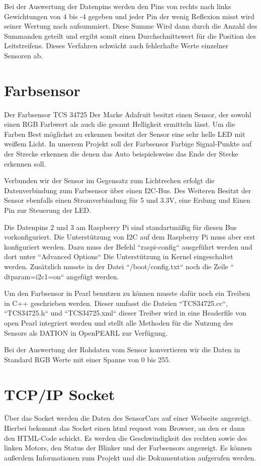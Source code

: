 Bei der Auswertung der Datenpins werden den Pins von rechts nach links Gewichtungen von 4 bis -4 gegeben und jeder Pin der wenig Reflexion misst wird seiner Wertung nach aufsummiert. Diese Summe Wird dann durch die Anzahl des Summanden geteilt und ergibt somit einen Durchschnittswert für die Position des Leitstreifens. Dieses Verfahren schwächt auch fehlerhafte Werte einzelner Sensoren ab.

\section{Farbsensor}
Der Farbsensor TCS 34725 Der Marke Adafruit besitzt einen Sensor, der sowohl einen RGB Farbwert als auch die gesamt Helligkeit ermitteln lässt. Um die Farben Best möglichst zu erkennen besitzt der Sensor eine sehr helle LED mit weißem Licht. In unserem Projekt soll der Farbsensor Farbige Signal-Punkte auf der Strecke erkennen die denen das Auto beispielsweise das Ende der Stecke erkennen soll. 

Verbunden wir der Sensor im Gegensatz zum Lichtrechen erfolgt die Datenverbindung zum Farbsensor über einen I2C-Bus. Des Weiteren Besitzt der Sensor ebenfalls einen Stromverbindung für 5 und 3.3V, eine Erdung und Einen Pin zur Steuerung der LED.

Die Datenpins 2 und 3 am Raspberry Pi sind standartmäßig für diesen Bus vorkonfiguriert. Die Unterstützung von I2C auf dem Raspberry Pi muss aber erst konfiguriert werden. Dazu muss der Befehl “raspi-config“ ausgeführt werden und dort unter “Advanced Options“ Die Unterstützung in Kernel eingeschaltet werden. Zusätzlich musste in der Datei “/boot/config.txt“ noch die Zeile “ dtparam=i2c1=on“ angefügt werden.

Um den Farbsensor in Pearl benutzen zu können musste dafür noch ein Treiben in C++ geschrieben werden. Dieser umfasst die Dateien “TCS34725.cc“, “TCS34725.h“ und “TCS34725.xml“ dieser Treiber wird in eine Headerfile von open Pearl integriert werden und stellt alle Methoden für die Nutzung des Sensors als DATION in OpenPEARL zur Verfügung.

Bei der Auswertung der Rohdaten vom Sensor konvertieren wir die Daten in Standard RGB Werte mit einer Spanne von 0 bis 255.

\section{TCP/IP Socket}
Über das Socket werden die Daten des SensorCars auf einer Webseite angezeigt. Hierbei bekommt das Socket einen html request vom Browser, an den er dann den HTML-Code schickt. Es werden die Geschwindigkeit des rechten sowie des linken Motors, den Status der Blinker und der Farbsensors angezeigt. Es können außerdem Informationen zum Projekt und die Dokumentation aufgerufen werden. 

